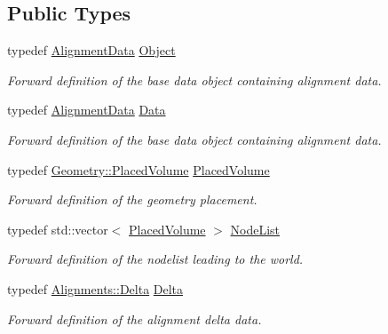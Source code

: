 \subsection*{Public Types}
\begin{DoxyCompactItemize}
\item 
typedef \hyperlink{class_d_d4hep_1_1_alignments_1_1_alignment_data}{Alignment\+Data} \hyperlink{class_d_d4hep_1_1_alignments_1_1_alignment_a3ed6fd0370cb7b8015d772df7ff005fc}{Object}
\begin{DoxyCompactList}\small\item\em Forward definition of the base data object containing alignment data. \end{DoxyCompactList}\item 
typedef \hyperlink{class_d_d4hep_1_1_alignments_1_1_alignment_data}{Alignment\+Data} \hyperlink{class_d_d4hep_1_1_alignments_1_1_alignment_a5ff6a2c0b838274552fbac2f52b9a652}{Data}
\begin{DoxyCompactList}\small\item\em Forward definition of the base data object containing alignment data. \end{DoxyCompactList}\item 
typedef \hyperlink{class_d_d4hep_1_1_geometry_1_1_placed_volume}{Geometry\+::\+Placed\+Volume} \hyperlink{class_d_d4hep_1_1_alignments_1_1_alignment_a69b234d416cfa4ace8a75322f2c58b66}{Placed\+Volume}
\begin{DoxyCompactList}\small\item\em Forward definition of the geometry placement. \end{DoxyCompactList}\item 
typedef std\+::vector$<$ \hyperlink{class_d_d4hep_1_1_alignments_1_1_alignment_a69b234d416cfa4ace8a75322f2c58b66}{Placed\+Volume} $>$ \hyperlink{class_d_d4hep_1_1_alignments_1_1_alignment_a83282984664b4e1117f46d8a8bc40cb7}{Node\+List}
\begin{DoxyCompactList}\small\item\em Forward definition of the nodelist leading to the world. \end{DoxyCompactList}\item 
typedef \hyperlink{class_d_d4hep_1_1_alignments_1_1_delta}{Alignments\+::\+Delta} \hyperlink{class_d_d4hep_1_1_alignments_1_1_alignment_a49bf0c4249a3b792bf6a016b1d067f64}{Delta}
\begin{DoxyCompactList}\small\item\em Forward definition of the alignment delta data. \end{DoxyCompactList}\item 

\end{DoxyCompactItemize}
